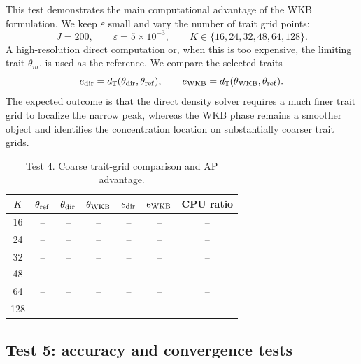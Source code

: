\documentclass[11pt]{article}
\begin{document}
This test demonstrates the main computational advantage of the WKB formulation.  We keep \(\varepsilon\) small and vary the number of trait grid points:
\[
    J=200,
    \qquad
    \varepsilon=5\times10^{-3},
    \qquad
    K\in\{16,24,32,48,64,128\}.
\]
A high-resolution direct computation or, when this is too expensive, the limiting trait \(\theta_m\), is used as the reference.  We compare the selected traits
\[
    e_{\rm dir}=d_{\mathbb T}(\theta_{\rm dir},\theta_{\rm ref}),
    \qquad
    e_{\rm WKB}=d_{\mathbb T}(\theta_{\rm WKB},\theta_{\rm ref}).
\]
The expected outcome is that the direct density solver requires a much finer trait grid to localize the narrow peak, whereas the WKB phase remains a smoother object and identifies the concentration location on substantially coarser trait grids.

\begin{table}[ht]
\centering
\caption{Test 4. Coarse trait-grid comparison and AP advantage.}
\begin{tabular}{ccccccc}
\toprule
$K$ & $\theta_{\rm ref}$ & $\theta_{\rm dir}$ & $\theta_{\rm WKB}$ & $e_{\rm dir}$ & $e_{\rm WKB}$ & CPU ratio\\
\midrule
16 & -- & -- & -- & -- & -- & --\\
24 & -- & -- & -- & -- & -- & --\\
32 & -- & -- & -- & -- & -- & --\\
48 & -- & -- & -- & -- & -- & --\\
64 & -- & -- & -- & -- & -- & --\\
128 & -- & -- & -- & -- & -- & --\\
\bottomrule
\end{tabular}
\end{table}

\subsection{Test 5: accuracy and convergence tests}\label{subsec:test_accuracy_new}
\end{document}
